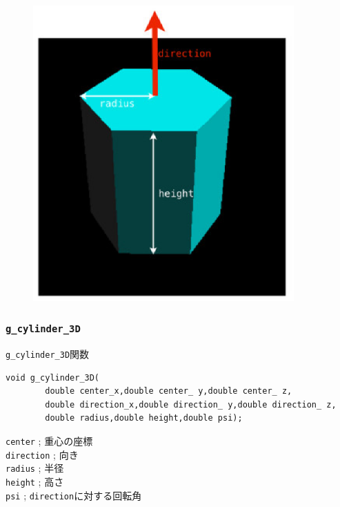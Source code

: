 \documentclass[a4paper,12pt]{jsarticle}%
\begin{document}
\begin{figure}[htb]
	\includegraphics[width=100mm]{./Figures/eps/Canvas_g_prism.eps}
\end{figure}



\clearpage
\subsubsection{\texttt{g\_cylinder\_3D}}

\begin{itembox}[l]{\texttt{g\_cylinder\_3D}関数}
\begin{verbatim}
void g_cylinder_3D(
        double center_x,double center_ y,double center_ z,
        double direction_x,double direction_ y,double direction_ z,
        double radius,double height,double psi);
\end{verbatim}
\verb|center| ; 重心の座標\\
\verb|direction| ; 向き\\
\verb|radius| ; 半径\\
\verb|height| ; 高さ\\
\verb|psi| ; \verb|direction|に対する回転角\\
\end{itembox}
\end{document}
